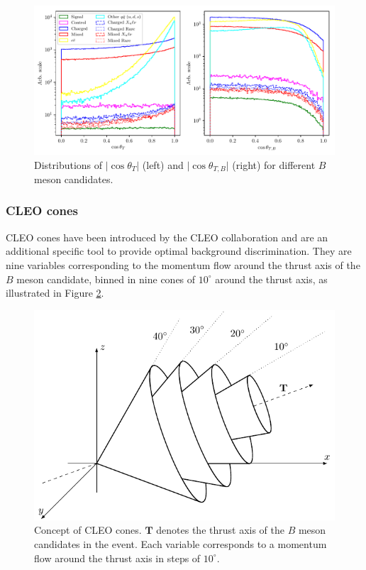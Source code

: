 \begin{figure}[H]
\centering
\captionsetup{width=0.8\linewidth}
\includegraphics[width=\linewidth]{fig/cs_cosplots}
\caption{Distributions of $\vert \cos\theta_T\vert$ (left) and $\vert \cos\theta_{T,B}\vert$ (right) for different $B$ meson candidates.}
\label{fig:cosplots}
\end{figure}

\subsubsection{CLEO cones}
CLEO cones have been introduced by the CLEO collaboration \cite{asner1996search} and are an additional specific tool to provide optimal background discrimination. They are nine variables corresponding to the momentum flow around the thrust axis of the $B$ meson candidate, binned in nine cones of $10^\circ$ around the thrust axis, as illustrated in Figure \ref{fig:ccones}. 

\begin{figure}[H]
\centering
\captionsetup{width=0.8\linewidth}
\includegraphics[scale=1]{texfig/CCones}
\caption{Concept of CLEO cones. $\mathbf{T}$ denotes the thrust axis of the $B$ meson candidates in the event. Each variable corresponds to a momentum flow around the thrust axis in steps of $10^\circ$.}
\label{fig:ccones}
\end{figure}

